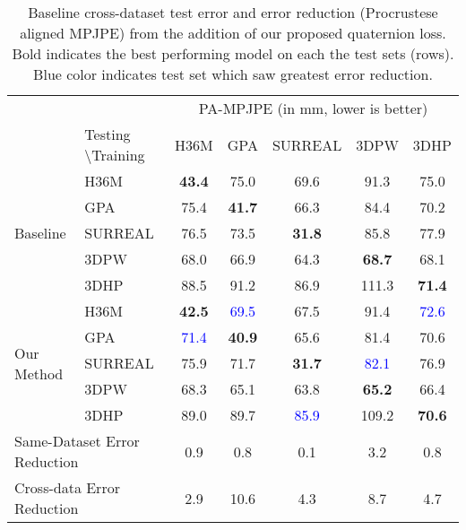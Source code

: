 \documentclass[runningheads]{llncs}
\begin{document}
\begin{table}[t]
\begin{center}
{\scriptsize
\begin{tabular}{@{}ll c c c c c@{}}
\toprule
 & &\multicolumn{5}{c}{PA-MPJPE (in mm, lower is better)} \\
 & Testing \textbackslash Training & H36M & GPA & SURREAL & 3DPW & 3DHP  \\
\hline
\multirow{5}{*}{Baseline} & H36M & \textbf{43.4} & 75.0 & 69.6 & 91.3  & 75.0\\
&GPA & 75.4 & \textbf{41.7} & 66.3 & 84.4 & 70.2 \\
&SURREAL & 76.5 & 73.5 & \textbf{31.8} & 85.8 & 77.9 \\
&3DPW & 68.0 & 66.9 & 64.3 & \textbf{68.7} & 68.1 \\
&3DHP & 88.5 & 91.2 & 86.9 & 111.3 &  \textbf{71.4} \\
\hline
\multirow{5}{*}{Our Method} & H36M & \textbf{42.5} & \textcolor{blue}{69.5} & 67.5 & 91.4 & \textcolor{blue}{72.6}  \\
& GPA & \textcolor{blue}{71.4} & \textbf{40.9} & 65.6 & 81.4 & 70.6  \\
& SURREAL & 75.9 & 71.7 & \textbf{31.7} & \textcolor{blue}{82.1} & 76.9\\
& 3DPW & 68.3 & 65.1 & 63.8 & \textbf{65.2} & 66.4  \\
& 3DHP & 89.0 & 89.7 & \textcolor{blue}{85.9} & 109.2 & \textbf{70.6} \\
\hline
\multicolumn{2}{l}{Same-Dataset Error Reduction } & 0.9 & 0.8 & 0.1 & 3.2 & 0.8 \\
\multicolumn{2}{l}{Cross-data Error Reduction } & 2.9 & 10.6 & 4.3 & 8.7 & 4.7\\

\bottomrule
\end{tabular}
}
\end{center}
\caption{Baseline cross-dataset test error and error reduction  (Procrustese 
aligned MPJPE) from the addition
of our proposed quaternion loss. Bold indicates the best performing model on 
each the test sets (rows). Blue color indicates test set which saw greatest error
reduction.}
\label{table:pampjpe}
\vspace{-0.15in}
\end{table}
\end{document}
